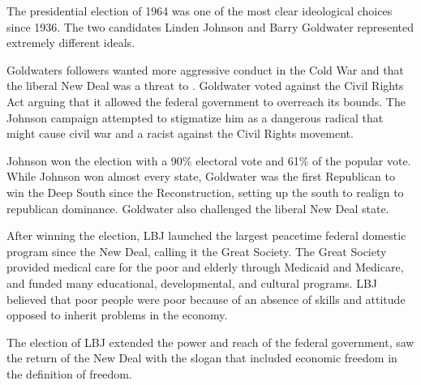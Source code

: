 The presidential election of 1964 was one of the most clear ideological choices since 1936. The two candidates Linden Johnson and Barry Goldwater represented extremely different ideals.

Goldwaters followers wanted more aggressive conduct in the Cold War and that the liberal New Deal was a threat to .
Goldwater voted against the Civil Rights Act arguing that it allowed the federal government to overreach its bounds.
The Johnson campaign attempted to stigmatize him as a dangerous radical that might cause civil war and a racist against the Civil Rights movement.

Johnson won the election with a 90\% electoral vote and 61\% of the popular vote.
While Johnson won almost every state, Goldwater was the first Republican to win the Deep South since the Reconstruction, setting up the south to realign to republican dominance.
Goldwater also challenged the liberal New Deal state.

After winning the election, LBJ launched the largest peacetime federal domestic program since the New Deal, calling it the Great Society.
The Great Society provided medical care for the poor and elderly through Medicaid and Medicare, and funded many educational, developmental, and cultural programs.
LBJ believed that poor people were poor because of an absence of skills and attitude opposed to inherit problems in the economy.

The election of LBJ extended the power and reach of the federal government, saw the return of the New Deal with the  slogan that included economic freedom in the definition of freedom.
